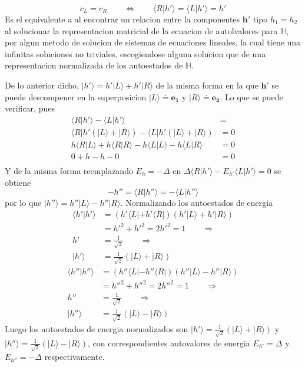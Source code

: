 \documentclass[a4paper]{article}
\begin{document}
\begin{answer}
\begin{itemize}
        $$c_L = c_R \qquad \Leftrightarrow \qquad \langle R|h'\rangle = \langle L| h'\rangle =h' $$
        Es el equivalente a al encontrar un relacion entre la componentes $\mathbf h'$ tipo $h_1 = h_2$ al solucionar la representacion 
        matricial de la ecuacion de autolvalores para $\mathbb H$, por algun metodo de solucion de sistemas de ecuaciones lineales, 
        la cual tiene una infinitas soluciones no triviales, escogiendose alguna solucion que de una representacion normalizada de los 
        autoestados de $\mathbb H$.
    
        De lo anterior dicho,  $|h'\rangle = h'|L \rangle + h'|R\rangle$ de la misma forma en la que $\mathbf h'$ se puede descompener 
        en la superposicion $|L\rangle \doteq \mathbf{e_1} $ y $|R\rangle \doteq \mathbf{e_2}$. Lo que se puede verificar, pues
        \begin{align*}
            \langle R|h'\rangle - \langle L| h'\rangle &= \\
            \langle R|h'(|L \rangle + |R\rangle) - \langle L|h'(|L \rangle + |R\rangle) &= 0 \\
            h\langle R|L \rangle +h \langle R|R\rangle - h\langle L| L\rangle - h\langle L|R\rangle &= 0 \\
            0 + h - h - 0 &= 0 \\
        \end{align*}
        Y de la misma forma reemplazando $E_h = -\Delta$ en $\Delta \langle R|h'\rangle - E_{h'}\langle L |h'\rangle = 0$ se obtiene
        $$-h'' = \langle R|h''\rangle = - \langle L| h''\rangle$$
        por lo que $|h''\rangle = h''|L \rangle - h''|R\rangle$.
        Normalizando los autoestados de energia
        \begin{align*}
            \langle h'|h'\rangle &= (h'\langle L| + h'\langle R|)(h'|L \rangle + h'|R\rangle) \\
            &= h'^2 + h'^2 = 2h'^2 = 1 \qquad \Rightarrow \qquad \\
            h' &= \frac{1}{\sqrt{2}} \qquad \Rightarrow \qquad \\
            |h'\rangle&= \frac{1}{\sqrt{2}}(|L \rangle + |R\rangle) 
        \end{align*}
        \begin{align*}
            \langle h''|h''\rangle &= (h''\langle L| - h''\langle R|)(h''|L \rangle - h''|R\rangle) \\
            &= h''^2 + h''^2 = 2h''^2 = 1 \qquad \Rightarrow \qquad \\
            h'' &= \frac{1}{\sqrt{2}} \qquad \Rightarrow \qquad \\
            |h''\rangle&= \frac{1}{\sqrt{2}}(|L \rangle - |R\rangle)
        \end{align*}    
        Luego los autoestados de energia normalizados son $|h'\rangle = \frac{1}{\sqrt{2}}(|L \rangle + |R\rangle)$ y $|h''\rangle = \frac{1}{\sqrt{2}}(|L \rangle - |R\rangle)$, 
        con correspondientes autovalores de energia $E_{h'} = \Delta$ y $E_{h''} = -\Delta$ respectivamente.


\end{itemize}
\end{answer}
\end{document}
